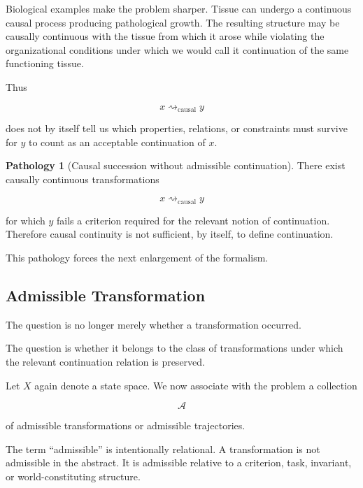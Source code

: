 \documentclass[
  11pt,
  a4paper,
  DIV=12,
  BCOR=0mm,
  parskip=half-
]{scrartcl}
\newcommand{\Adm}{\mathcal A}
\newcommand{\leadcausal}{%
  \mathrel{\rightsquigarrow_{\mathrm{causal}}}%
}
\theoremstyle{definition}
\newtheorem{pathology}[definition]{Pathology}
\theoremstyle{plain}
\theoremstyle{remark}
\begin{document}
Biological examples make the problem sharper. Tissue can undergo a continuous
causal process producing pathological growth. The resulting structure may be
causally continuous with the tissue from which it arose while violating the
organizational conditions under which we would call it continuation of the
same functioning tissue.

Thus

\[
  x\leadcausal y
\]

does not by itself tell us which properties, relations, or constraints must
survive for \(y\) to count as an acceptable continuation of \(x\).

\begin{pathology}[Causal succession without admissible continuation]
\label{path:causal-insufficiency}
There exist causally continuous transformations

\[
  x\leadcausal y
\]

for which \(y\) fails a criterion required for the relevant notion of
continuation. Therefore causal continuity is not sufficient, by itself, to
define continuation.
\end{pathology}

This pathology forces the next enlargement of the formalism.


\subsection{Admissible Transformation}
\label{sec:admissibility}

The question is no longer merely whether a transformation occurred.

The question is whether it belongs to the class of transformations under
which the relevant continuation relation is preserved.

Let \(X\) again denote a state space. We now associate with the problem a
collection

\[
  \Adm
\]

of admissible transformations or admissible trajectories.

The term \enquote{admissible} is intentionally relational. A transformation
is not admissible in the abstract. It is admissible relative to a criterion,
task, invariant, or world-constituting structure.
\end{document}
